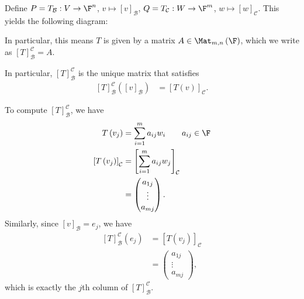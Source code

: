 \documentclass[10pt]{mypackage}
\begin{document}
Define $P = T_{\mathcal{B}}: V\rightarrow \F^n$, $v\mapsto \left[v\right]_{\mathcal{B}}$, $Q =  T_{\mathcal{C}}: W\rightarrow \F^{m}$, $w \mapsto \left[w\right]_{\mathcal{C}}$. This yields the following diagram:
\begin{center}
\end{center}
In particular, this means $T$ is given by a matrix $A\in \Mat_{m,n}\left(\F\right)$, which we write as $\left[T\right]_{\mathcal{B}}^{\mathcal{C}} = A$.\newline

In particular, $\left[T\right]_{\mathcal{B}}^{\mathcal{C}}$ is the unique matrix that satisfies
\begin{align*}
  \left[T\right]_{\mathcal{B}}^{\mathcal{C}}\left(\left[v\right]_{\mathcal{B}}\right) &= \left[T(v)\right]_{\mathcal{C}}.
\end{align*}

To compute $\left[T\right]_{\mathcal{B}}^{\mathcal{C}}$, we have
  \begin{align*}
    T\left(v_j\right) &= \sum_{i=1}^{m}a_{ij}w_i \tag*{$a_{ij}\in\F$}\\
    \left[T\left(v_j\right)\right]_{\mathcal{C}} &= \left[\sum_{i=1}^{m}a_{ij}w_j\right]_{\mathcal{C}}\\
                                                 &= \begin{pmatrix}a_{1j}\\\vdots\\a_{mj}\end{pmatrix}.
  \end{align*}
  Similarly, since $\left[v\right]_{\mathcal{B}} = e_j$, we have
  \begin{align*}
    \left[T\right]_{\mathcal{B}}^{\mathcal{C}}\left(e_j\right) &= \left[T\left(v_j\right)\right]_{\mathcal{C}}\\
                                                               &= \begin{pmatrix}a_{1j}\\\vdots\\a_{mj}\end{pmatrix},
  \end{align*}
  which is exactly the $j$th column of $\left[T\right]_{\mathcal{B}}^{\mathcal{C}}$.\newline
\end{document}
